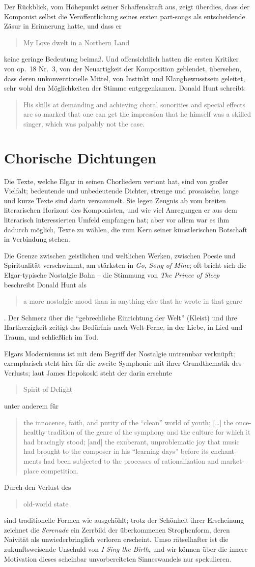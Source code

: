 \documentclass[a4paper,11pt,open=any]{scrbook}
\newcommand{\engquote}[1]{\foreignblockquote{english}{#1}}
\begin{document}
Der Rückblick, vom Höhepunkt seiner Schaffenskraft aus, zeigt überdies,
dass der Komponist selbst die Veröffentlichung seines ersten part-songs
als entscheidende Zäsur in Erinnerung hatte, und dass er \engquote{My Love
dwelt in a Northern Land} keine geringe Bedeutung beimaß.  Und offensichtlich
hatten die ersten Kritiker von op.~18 Nr.~3, von der Neuartigkeit der
Komposition geblendet, übersehen, dass deren unkonventionelle Mittel, von
Instinkt und Klangbewusstsein geleitet, sehr wohl den Möglichkeiten der
Stimme entgegenkamen.  Donald Hunt schreibt: \engquote{His skills at
demanding and achieving choral sonorities and special effects are so
marked that one can get the impression that he himself was a skilled
singer, which was palpably not the case.}\cite[S.~xi]{ece13}

\section{Chorische Dichtungen}
Die Texte, welche Elgar in seinen Chorliedern vertont hat, sind von großer
Vielfalt; bedeutende und unbedeutende Dichter, strenge und prosaische, lange
und kurze Texte sind darin versammelt.  Sie legen Zeugnis ab vom breiten
literarischen Horizont des Komponisten, und wie viel Anregungen er aus dem
literarisch interessierten Umfeld empfangen hat; aber vor allem war es ihm
dadurch möglich, Texte zu wählen, die zum Kern seiner künstlerischen Botschaft
in Verbindung stehen.

Die Grenze zwischen geistlichen und weltlichen Werken, zwischen Poesie und
Spiritualität verschwimmt, am stärksten in \textit{Go, Song of Mine}; oft
bricht sich die Elgar-typische Nostalgie Bahn – die Stimmung von \textit{The
Prince of Sleep} beschreibt Donald Hunt als \engquote{a more nostalgic mood
than in anything else that he wrote in that genre}\cite[S.~x]{ece13}.  Der
Schmerz über die \enquote{gebrechliche Einrichtung der Welt} (Kleist) und
ihre Hartherzigkeit zeitigt das Bedürfnis nach Welt-Ferne, in der Liebe,
in Lied und Traum, und schließlich im Tod.

Elgars Modernismus ist mit dem Begriff der Nostalgie untrennbar verknüpft;
exemplarisch steht hier für die zweite Symphonie mit ihrer Grundthematik
des Verlusts; laut James Hepokoski steht der darin ersehnte \engquote{Spirit
of Delight} unter anderem für \engquote{the innocence, faith, and purity of
the \enquote{clean} world of youth; […] the once-healthy tradition of the
genre of the symphony and the culture for which it had bracingly stood; [and]
the exuberant, unproblematic joy that music had brought to the composer
in his \enquote{learning days} before its enchantments had been subjected
to the processes of rationalization and marketplace competition.\cite
[zitiert nach][S.~159]{mark}}
Durch den Verlust des \engquote{old-world state} sind traditionelle
Formen wie ausgehöhlt; trotz der Schönheit ihrer Erscheinung zeichnet
die \textit{Serenade} ein Zerrbild der überkommenen Strophenform, deren
Naivität als unwiederbringlich verloren erscheint.  Umso rätselhafter
ist die zukunftsweisende Unschuld von \textit{I Sing the Birth}, und
wir können über die innere Motivation dieses scheinbar unvorbereiteten
Sinneswandels nur spekulieren.
\end{document}
